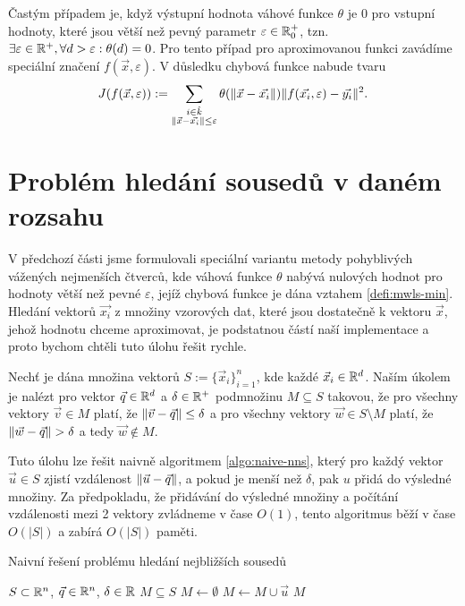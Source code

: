 Častým případem je, když výstupní hodnota váhové funkce $\theta$ je $0$ pro vstupní hodnoty, které jsou větší než pevný parametr $\varepsilon \in \mathbb{R}^+_0$, tzn. $\exists \varepsilon \in \mathbb{R}^+, \forall d > \varepsilon: \theta(d) = 0$. Pro tento případ pro aproximovanou funkci zavádíme speciální značení $f(\vec{x}, \varepsilon)$. V důsledku chybová funkce nabude tvaru
\newcommand{\mwlssum}{\sum_{\substack{i \in \hat k\\\norm{\vec{x}-\vec{x_i}} \leq \varepsilon}}}
\begin{equation}
  \label{defi:mwls-min}
  J(f(\vec{x},\varepsilon)) := \mwlssum \theta(\norm{\vec{x} - \vec{x_i}})\norm{f(\vec{x_i}, \varepsilon) - \vec{y_i}}^2.
\end{equation}

\section{Problém hledání sousedů v daném rozsahu}

V předchozí části jsme formulovali speciální variantu metody pohyblivých vážených nejmenších čtverců, kde váhová funkce $\theta$ nabývá nulových hodnot pro hodnoty větší než pevné $\varepsilon$, jejíž chybová funkce je dána vztahem \eqref{defi:mwls-min}. Hledání vektorů $\vec{x_i}$ z množiny vzorových dat, které jsou dostatečně  k vektoru $\vec{x}$, jehož hodnotu chceme aproximovat, je podstatnou částí naší implementace a proto bychom chtěli tuto úlohu řešit rychle.

Nechť je dána množina vektorů $S := \{\vec{x}_i\}_{i = 1}^n$, kde každé $\vec{x}_i \in \mathbb{R}^d$. Naším úkolem je nalézt pro vektor $\vec{q} \in \mathbb{R}^d$ a $\delta \in \mathbb{R}^+$ podmnožinu $M \subseteq S$ takovou, že pro všechny vektory $\vec{v} \in M$ platí, že $\|\vec{v} - \vec{q}\| \leq \delta$ a pro všechny vektory $\vec{w} \in S \setminus M$ platí, že $\|\vec{w} - \vec{q}\| > \delta$ a tedy $\vec{w} \not\in M$.

Tuto úlohu lze řešit naivně algoritmem \ref{algo:naive-nns}, který pro každý vektor $\vec{u} \in S$ zjistí vzdálenost $\|\vec{u} - \vec{q}\|$, a pokud je menší než $\delta$, pak $u$ přidá do výsledné množiny. Za předpokladu, že přidávání do výsledné množiny a počítání vzdálenosti mezi 2 vektory zvládneme v čase $O(1)$, tento algoritmus běží v čase $O(|S|)$ a zabírá $O(|S|)$ paměti.

\begin{algorithm}[ht!]
  \caption{Naivní řešení problému hledání nejbližších sousedů}
  \label{algo:naive-nns}
  \begin{algorithmic}
    \Require $S \subset \mathbb{R}^n$, $\vec{q} \in \mathbb{R}^n$, $\delta \in \mathbb{R}$
    \Ensure $M \subseteq S$
      \State $M \leftarrow \emptyset$
            \State $M \leftarrow M \cup \vec{u}$
          \EndIf
      \EndFor
    \State \Return $M$
    \EndProcedure
  \end{algorithmic}
\end{algorithm}

